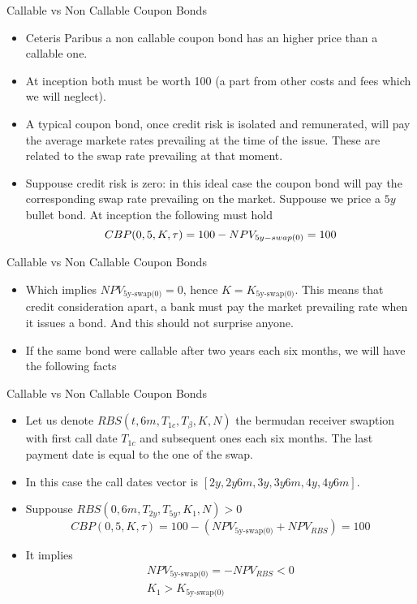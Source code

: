 \documentclass{beamer}
\begin{document}
\begin{frame}{Callable vs Non Callable Coupon Bonds}
	\begin{itemize}
		\item Ceteris Paribus a non callable coupon bond has an higher price than a callable one.
		\item At inception both must be worth 100 (a part from other costs and fees which we will neglect).
		\item A typical coupon bond, once credit risk is isolated and remunerated, will pay the average markete rates prevailing at the time of the issue. These are related to the swap rate prevailing at that moment.
		\item Suppouse credit risk is zero: in this ideal case the coupon bond will pay the corresponding swap rate prevailing on the market.
		Suppouse we price a $5y$ bullet bond. At inception the following must hold
		\begin{equation}
			CBP(0,5,K,\tau)=100-NPV_{\text5y-swap(0)}=100
		\end{equation}
	\end{itemize}
\end{frame}

\begin{frame}{Callable vs Non Callable Coupon Bonds}
	\begin{itemize}
		\item Which implies $NPV_{\text{5y-swap(0)}}=0$, hence $K=K_{\text{5y-swap(0)}}$. This means that credit consideration apart, a bank must pay the market prevailing rate when it issues a bond. And this should not surprise anyone.
		\item If the same bond were callable after two years each six months, we will have the following facts
	\end{itemize}
\end{frame}

\begin{frame}{Callable vs Non Callable Coupon Bonds}
	\begin{itemize}
		\item Let us denote $RBS(t,6m,T_{1c},T_\beta,K,N)$ the bermudan receiver swaption with first call date $T_{1c}$ and subsequent ones each six months. The last payment date is equal to the one of the swap.
		\item In this case the call dates vector is $[2y,2y6m,3y,3y6m,4y,4y6m]$.
		\item Suppouse $RBS(0,6m,T_{2y},T_{5y},K_1,N)>0$
		\begin{equation}
			CBP(0,5,K,\tau)=100-(NPV_{\text{5y-swap(0)}}+NPV_{RBS})=100
		\end{equation}
		\item It implies 
		\begin{equation}
			\begin{gathered}
				NPV_{\text{5y-swap(0)}}=-NPV_{RBS}<0 \\
				K_1 > K_{\text{5y-swap(0)}}
			\end{gathered}
		\end{equation}
	\end{itemize}
\end{frame}
\end{document}
